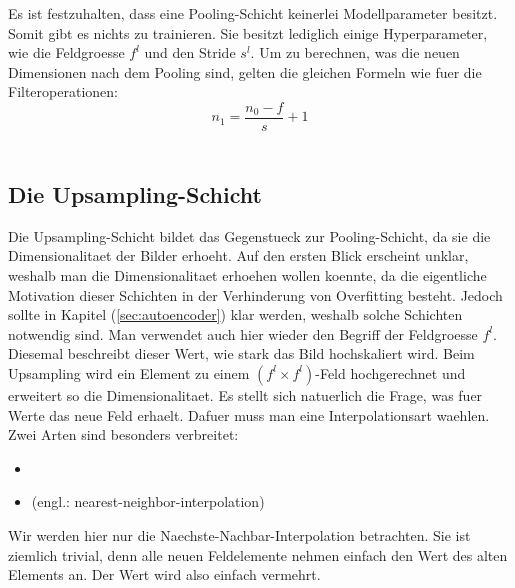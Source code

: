 \para{}
Es ist festzuhalten, dass eine Pooling-Schicht keinerlei Modellparameter
besitzt. Somit gibt es nichts zu trainieren. Sie besitzt lediglich einige
Hyperparameter, wie die Feldgroesse $f^l$ und den Stride $s^l$.
\para{}
Um zu berechnen, was die neuen Dimensionen nach dem Pooling sind, gelten die
gleichen Formeln wie fuer die Filteroperationen:
\\
\begin{equation}
  n_1 = \frac{n_0 - f}{s} + 1
\end{equation}
\\


\cite{deeplearning.ai:cnn}
\cite{Goodfellow-et-al-2016}

\subsection{Die Upsampling-Schicht}
Die Upsampling-Schicht bildet das Gegenstueck zur Pooling-Schicht, da sie die
Dimensionalitaet der Bilder erhoeht. Auf den ersten Blick erscheint unklar,
weshalb man die Dimensionalitaet erhoehen wollen koennte, da die eigentliche
Motivation dieser Schichten in der Verhinderung von Overfitting besteht. Jedoch
sollte in Kapitel (\ref{sec:autoencoder}) klar werden, weshalb solche Schichten
notwendig sind.
\para{}
Man verwendet auch hier wieder den Begriff der Feldgroesse $f^l$. Diesemal
beschreibt dieser Wert, wie stark das Bild hochskaliert wird. Beim Upsampling
wird ein Element zu einem $(f^l \times f^l)$-Feld hochgerechnet und erweitert so die
Dimensionalitaet.
\para{}
Es stellt sich natuerlich die Frage, was fuer Werte das neue Feld erhaelt.
Dafuer muss man eine Interpolationsart waehlen.
Zwei Arten sind besonders verbreitet:
\begin{itemize}
\item{}
\item{ (engl.: nearest-neighbor-interpolation)}
\end{itemize}
Wir werden hier nur die Naechste-Nachbar-Interpolation betrachten. Sie ist
ziemlich trivial, denn alle neuen Feldelemente nehmen einfach den Wert des alten
Elements an. Der Wert wird also einfach vermehrt.


\cite{deeplearning.ai:cnn}
\cite{Goodfellow-et-al-2016}

\pagebreak

